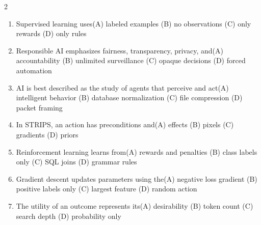 \documentclass[a4paper]{article}
\begin{document}
\begin{multicols*}{2}
\begin{enumerate}
\item Supervised learning uses\newline\hspace*{0.6em}(A) labeled examples \quad (B) no observations \newline\hspace*{0.6em}(C) only rewards \quad (D) only rules
\item Responsible AI emphasizes fairness, transparency, privacy, and\newline\hspace*{0.6em}(A) accountability \quad (B) unlimited surveillance \newline\hspace*{0.6em}(C) opaque decisions \quad (D) forced automation
\item AI is best described as the study of agents that perceive and act\newline\hspace*{0.6em}(A) intelligent behavior \quad (B) database normalization \newline\hspace*{0.6em}(C) file compression \quad (D) packet framing
\item In STRIPS, an action has preconditions and\newline\hspace*{0.6em}(A) effects \quad (B) pixels \newline\hspace*{0.6em}(C) gradients \quad (D) priors
\item Reinforcement learning learns from\newline\hspace*{0.6em}(A) rewards and penalties \quad (B) class labels only \newline\hspace*{0.6em}(C) SQL joins \quad (D) grammar rules
\item Gradient descent updates parameters using the\newline\hspace*{0.6em}(A) negative loss gradient \quad (B) positive labels only \newline\hspace*{0.6em}(C) largest feature \quad (D) random action
\item The utility of an outcome represents its\newline\hspace*{0.6em}(A) desirability \quad (B) token count \newline\hspace*{0.6em}(C) search depth \quad (D) probability only

\end{enumerate}
\end{multicols*}
\end{document}
